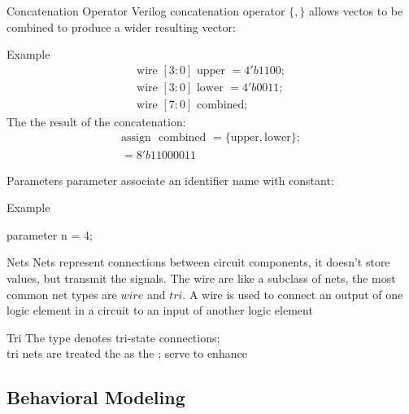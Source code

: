 \begin{parag}{Concatenation Operator}
    Verilog concatenation operator $\{, \}$ allows vectos to be combined to produce a wider resulting vector:
    \begin{subparag}{Example}
        \begin{align*}
            \text{wire } [3:0] \text{ upper } = 4'b1100;\\
            \text{wire } [3:0] \text{ lower } = 4'b0011;\\
            \text{wire } [7:0] \text{ combined};
        \end{align*}
       The the result of the concatenation:
       \begin{align*}
           \text{assign } \text{ combined } = \{ \text{upper}, \text{lower}\}; \\
           = 8'b11000011
       \end{align*}
       
        
    \end{subparag}

\end{parag}
\begin{parag}{Parameters}
    parameter associate an identifier name with constant:
    \begin{subparag}{Example}
        \begin{center}
            parameter n = 4;
        \end{center}
    \end{subparag}

\end{parag}


\begin{parag}{Nets}
    Nets represent connections between circuit components, it doesn't store values, but transmit the signals. The wire are like a subclass of nets, the most common net types are $wire$ and $tri$. A wire is used to connect an output of one logic element in a circuit to an input of another logic element
    \begin{subparag}{Tri}
        The  type denotes tri-state connections;\\
           tri nets are treated the  as the ; serve to enhance  
    \end{subparag}
\end{parag}
\subsection{Behavioral Modeling}



